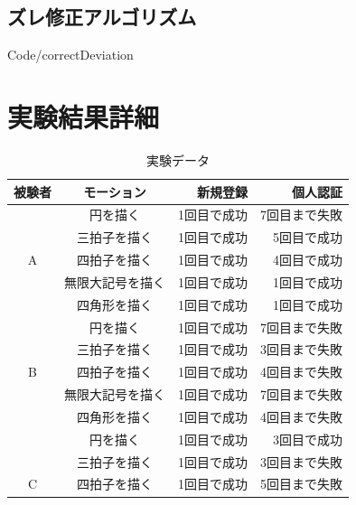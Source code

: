 \documentclass[11pt]{jreport}
\renewcommand{\slash}{/}
\begin{document}
    \section{ズレ修正アルゴリズム}
    
    {Code\slash correctDeviation}

\chapter{実験結果詳細}
        \begin{center}
            \begin{longtable}{|c|c|r|r|}
            \caption{実験データ}
            \label{detail} \\ \hline
                被験者 & モーション & 新規登録 & 個人認証 \\ \hline \hline \endhead
                  & 円を描く & 1回目で成功 & 7回目まで失敗 \\ \cline{2-4} %
                  & 三拍子を描く & 1回目で成功 & 5回目で成功 \\ \cline{2-4}
                A & 四拍子を描く & 1回目で成功 & 4回目で成功 \\ \cline{2-4}
                  & 無限大記号を描く & 1回目で成功 & 1回目で成功 \\ \cline{2-4}
                  & 四角形を描く & 1回目で成功 & 1回目で成功 \\ \hline %
                  & 円を描く & 1回目で成功 & 7回目まで失敗 \\ \cline{2-4} %
                  & 三拍子を描く & 1回目で成功 & 3回目まで失敗 \\ \cline{2-4}
                B & 四拍子を描く & 1回目で成功 & 4回目まで失敗 \\ \cline{2-4}
                  & 無限大記号を描く & 1回目で成功 & 7回目まで失敗 \\ \cline{2-4}
                  & 四角形を描く & 1回目で成功 & 4回目まで失敗 \\ \hline %
                  & 円を描く & 1回目で成功 & 3回目で成功 \\ \cline{2-4} %
                  & 三拍子を描く & 1回目で成功 & 3回目まで失敗 \\ \cline{2-4}
                C & 四拍子を描く & 1回目で成功 & 5回目まで失敗 \\ \cline{2-4}

\end{longtable}
\end{center}
\end{document}
